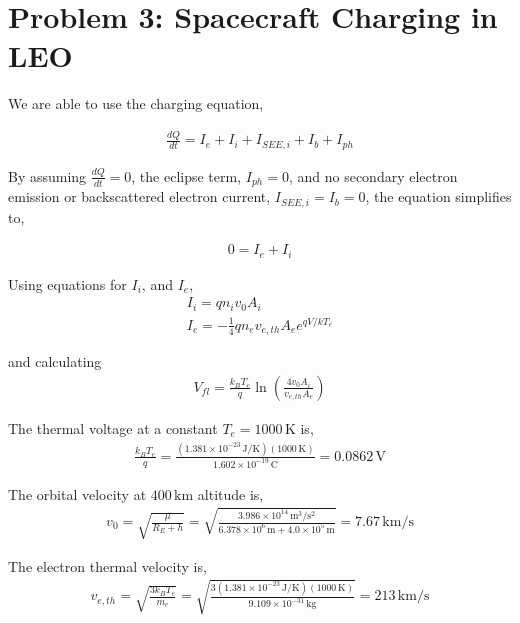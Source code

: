 \documentclass[11pt]{article}
\begin{document}
\newpage
\section*{Problem 3: Spacecraft Charging in LEO}
\hspace*{2em}We are able to use the charging equation,

\begin{gather*}
\frac{dQ}{dt} = I_e + I_i + I_{SEE,i} + I_b + I_{ph}
\end{gather*}

\hspace*{2em}By assuming $\frac{dQ}{dt} = 0$, the eclipse term, $I_{ph}=0$, 
and no secondary electron emission or backscattered electron current, $I_{SEE,i} = I_b = 0$, the equation simplifies to,

\begin{gather*}
0 = I_e + I_i
\end{gather*}

\hspace*{2em}Using equations for $I_i$, and $I_e$,
\begin{gather*}
I_i = q n_i v_{0} A_i \\
I_e = -\frac{1}{4} q n_e v_{e,th} A_e e^{qV/kT_e}
\end{gather*}

\hspace*{2em}and calculating 
\begin{gather*}
V_{fl} = \frac{k_B T_e}{q}\ln\left(\frac{4 v_0 A_i}{v_{e,th} A_e}\right)
\end{gather*}

\hspace*{2em}The thermal voltage at a constant $T_e = 1000\,\mathrm{K}$ is,
\begin{gather*}
\frac{k_B T_e}{q} = \frac{(1.381\times10^{-23}\,\mathrm{J/K})(1000\,\mathrm{K})}{1.602\times10^{-19}\,\mathrm{C}} = 0.0862\,\mathrm{V}
\end{gather*}

\hspace*{2em}The orbital velocity at $400\,\mathrm{km}$ altitude is,
\begin{gather*}
v_0 = \sqrt{\frac{\mu}{R_E + h}} = \sqrt{\frac{3.986\times10^{14}\,\mathrm{m^3/s^2}}{6.378\times10^{6}\,\mathrm{m} + 4.0\times10^{5}\,\mathrm{m}}} = 7.67\,\mathrm{km/s}
\end{gather*}

\hspace*{2em}The electron thermal velocity is,
\begin{gather*}
v_{e,th} = \sqrt{\frac{3 k_B T_e}{m_e}} = \sqrt{\frac{3(1.381\times10^{-23}\,\mathrm{J/K})(1000\,\mathrm{K})}{9.109\times10^{-31}\,\mathrm{kg}}} = 213\,\mathrm{km/s}
\end{gather*}
\end{document}
